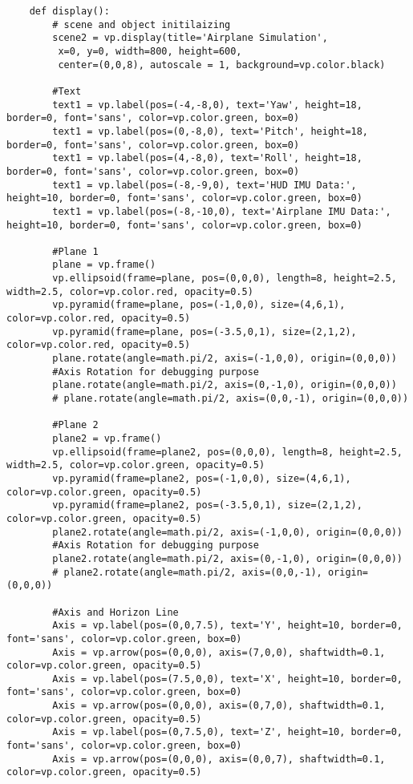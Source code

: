 \begin{lstlisting}
	def display():
		# scene and object initilaizing
		scene2 = vp.display(title='Airplane Simulation',
	     x=0, y=0, width=800, height=600,
	     center=(0,0,8), autoscale = 1, background=vp.color.black)
		 
		#Text  
		text1 = vp.label(pos=(-4,-8,0), text='Yaw', height=18, border=0, font='sans', color=vp.color.green, box=0)
		text1 = vp.label(pos=(0,-8,0), text='Pitch', height=18, border=0, font='sans', color=vp.color.green, box=0)
		text1 = vp.label(pos=(4,-8,0), text='Roll', height=18, border=0, font='sans', color=vp.color.green, box=0)
		text1 = vp.label(pos=(-8,-9,0), text='HUD IMU Data:', height=10, border=0, font='sans', color=vp.color.green, box=0)
		text1 = vp.label(pos=(-8,-10,0), text='Airplane IMU Data:', height=10, border=0, font='sans', color=vp.color.green, box=0)
		
		#Plane 1
		plane = vp.frame()
		vp.ellipsoid(frame=plane, pos=(0,0,0), length=8, height=2.5, width=2.5, color=vp.color.red, opacity=0.5)
		vp.pyramid(frame=plane, pos=(-1,0,0), size=(4,6,1), color=vp.color.red, opacity=0.5)
		vp.pyramid(frame=plane, pos=(-3.5,0,1), size=(2,1,2), color=vp.color.red, opacity=0.5)
		plane.rotate(angle=math.pi/2, axis=(-1,0,0), origin=(0,0,0))
		#Axis Rotation for debugging purpose
		plane.rotate(angle=math.pi/2, axis=(0,-1,0), origin=(0,0,0))
		# plane.rotate(angle=math.pi/2, axis=(0,0,-1), origin=(0,0,0))
		
		#Plane 2
		plane2 = vp.frame()
		vp.ellipsoid(frame=plane2, pos=(0,0,0), length=8, height=2.5, width=2.5, color=vp.color.green, opacity=0.5)
		vp.pyramid(frame=plane2, pos=(-1,0,0), size=(4,6,1), color=vp.color.green, opacity=0.5)
		vp.pyramid(frame=plane2, pos=(-3.5,0,1), size=(2,1,2), color=vp.color.green, opacity=0.5)
		plane2.rotate(angle=math.pi/2, axis=(-1,0,0), origin=(0,0,0))
		#Axis Rotation for debugging purpose
		plane2.rotate(angle=math.pi/2, axis=(0,-1,0), origin=(0,0,0))
		# plane2.rotate(angle=math.pi/2, axis=(0,0,-1), origin=(0,0,0))
		
		#Axis and Horizon Line
		Axis = vp.label(pos=(0,0,7.5), text='Y', height=10, border=0, font='sans', color=vp.color.green, box=0)
		Axis = vp.arrow(pos=(0,0,0), axis=(7,0,0), shaftwidth=0.1, color=vp.color.green, opacity=0.5)
		Axis = vp.label(pos=(7.5,0,0), text='X', height=10, border=0, font='sans', color=vp.color.green, box=0)
		Axis = vp.arrow(pos=(0,0,0), axis=(0,7,0), shaftwidth=0.1, color=vp.color.green, opacity=0.5)
		Axis = vp.label(pos=(0,7.5,0), text='Z', height=10, border=0, font='sans', color=vp.color.green, box=0)
		Axis = vp.arrow(pos=(0,0,0), axis=(0,0,7), shaftwidth=0.1, color=vp.color.green, opacity=0.5)
		

\end{lstlisting}
